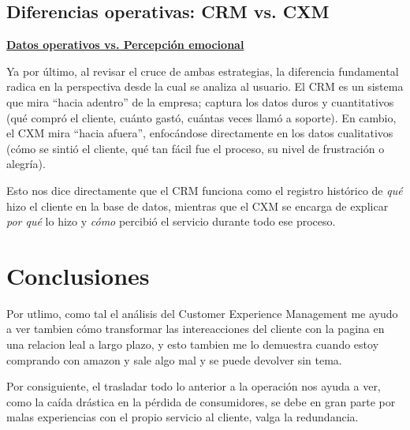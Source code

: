 \documentclass[letterpaper,11pt]{article}
\begin{document}
\subsection{Diferencias operativas: CRM vs. CXM}


\underline{\hspace{0.5cm}\textbf{Datos operativos vs. Percepción emocional}\hspace{0.5cm}}

Ya por último, al revisar el cruce de ambas estrategias, la diferencia fundamental radica en la perspectiva desde la cual se analiza al usuario. El CRM es un sistema que mira ``hacia adentro'' de la empresa; captura los datos duros y cuantitativos (qué compró el cliente, cuánto gastó, cuántas veces llamó a soporte). En cambio, el CXM mira ``hacia afuera'', enfocándose directamente en los datos cualitativos (cómo se sintió el cliente, qué tan fácil fue el proceso, su nivel de frustración o alegría). 

Esto nos dice directamente que el CRM funciona como el registro histórico de \textit{qué} hizo el cliente en la base de datos, mientras que el CXM se encarga de explicar \textit{por qué} lo hizo y \textit{cómo} percibió el servicio durante todo ese proceso.


\newpage

\section{Conclusiones}

Por utlimo, como tal 
el análisis del Customer Experience Management me ayudo a ver tambien 
cómo transformar las intereacciones del cliente con la pagina  
en una relacion leal a largo plazo, y esto tambien me lo demuestra cuando estoy comprando con amazon 
y sale algo mal y se puede devolver sin tema. 


Por consiguiente, 
el trasladar todo lo anterior a la 
operación nos ayuda a ver, 
como la caída drástica en la pérdida de consumidores, se debe en gran parte por malas experiencias 
con el propio servicio al cliente, valga la redundancia. 


\nocite{*}
\printbibliography[heading=bibintoc, title={Referencias}]
\end{document}
